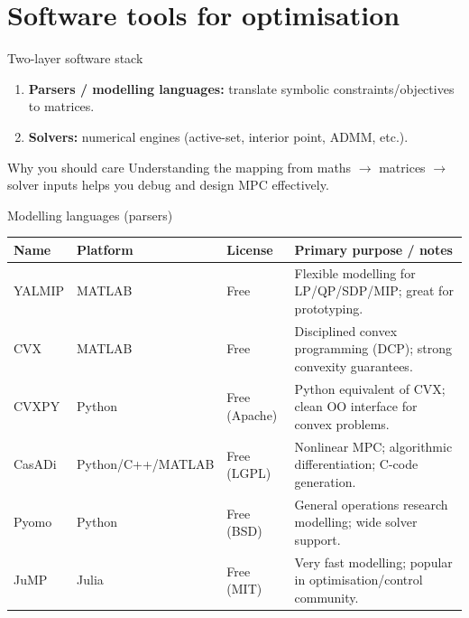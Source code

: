 \documentclass[aspectratio=169,10pt]{beamer}
\begin{document}
\section{Software tools for optimisation}

\begin{frame}{Two-layer software stack}
\begin{enumerate}
  \item \textbf{Parsers / modelling languages:} translate symbolic constraints/objectives to matrices.
  \item \textbf{Solvers:} numerical engines (active-set, interior point, ADMM, etc.).
\end{enumerate}

\begin{notebox}{Why you should care}
Understanding the mapping from maths $\rightarrow$ matrices $\rightarrow$ solver inputs helps you debug and design MPC effectively.
\end{notebox}
\end{frame}

\begin{frame}{Modelling languages (parsers)}
\scriptsize
\begin{table}
\centering
\renewcommand{\arraystretch}{1.15}
\begin{tabularx}{\linewidth}{@{}l l l X@{}}
\toprule
\textbf{Name} & \textbf{Platform} & \textbf{License} & \textbf{Primary purpose / notes}\\
\midrule
YALMIP & MATLAB & Free & Flexible modelling for LP/QP/SDP/MIP; great for prototyping.\\
CVX & MATLAB & Free & Disciplined convex programming (DCP); strong convexity guarantees.\\
CVXPY & Python & Free (Apache) & Python equivalent of CVX; clean OO interface for convex problems.\\
CasADi & Python/C++/MATLAB & Free (LGPL) & Nonlinear MPC; algorithmic differentiation; C-code generation.\\
Pyomo & Python & Free (BSD) & General operations research modelling; wide solver support.\\
JuMP & Julia & Free (MIT) & Very fast modelling; popular in optimisation/control community.\\
\bottomrule
\end{tabularx}
\end{table}
\end{frame}
\end{document}
